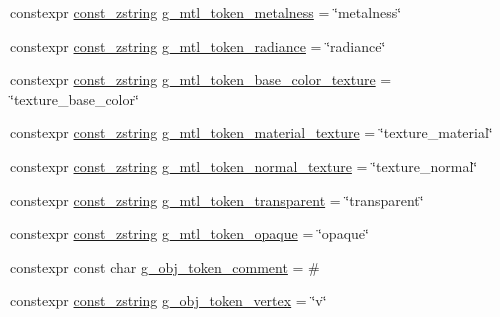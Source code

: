 \begin{DoxyCompactItemize}
\item 
constexpr \hyperlink{namespacemage_abfd9206dc607ceb5d13ec68bf075a5c0}{const\+\_\+zstring} \hyperlink{namespacemage_1_1rendering_1_1loader_a17bfd9071437318629c792d38ca71808}{g\+\_\+mtl\+\_\+token\+\_\+metalness} = \char`\"{}metalness\char`\"{}
\item 
constexpr \hyperlink{namespacemage_abfd9206dc607ceb5d13ec68bf075a5c0}{const\+\_\+zstring} \hyperlink{namespacemage_1_1rendering_1_1loader_a5abd3a154bef9be04f7649447c50164a}{g\+\_\+mtl\+\_\+token\+\_\+radiance} = \char`\"{}radiance\char`\"{}
\item 
constexpr \hyperlink{namespacemage_abfd9206dc607ceb5d13ec68bf075a5c0}{const\+\_\+zstring} \hyperlink{namespacemage_1_1rendering_1_1loader_aa3dfb00f93883473d1ff397f0079364e}{g\+\_\+mtl\+\_\+token\+\_\+base\+\_\+color\+\_\+texture} = \char`\"{}texture\+\_\+base\+\_\+color\char`\"{}
\item 
constexpr \hyperlink{namespacemage_abfd9206dc607ceb5d13ec68bf075a5c0}{const\+\_\+zstring} \hyperlink{namespacemage_1_1rendering_1_1loader_a0bd068f0f246c00b56412b1bd7f70ed4}{g\+\_\+mtl\+\_\+token\+\_\+material\+\_\+texture} = \char`\"{}texture\+\_\+material\char`\"{}
\item 
constexpr \hyperlink{namespacemage_abfd9206dc607ceb5d13ec68bf075a5c0}{const\+\_\+zstring} \hyperlink{namespacemage_1_1rendering_1_1loader_afa917f0393f16f0fec40ad5d85aa65f9}{g\+\_\+mtl\+\_\+token\+\_\+normal\+\_\+texture} = \char`\"{}texture\+\_\+normal\char`\"{}
\item 
constexpr \hyperlink{namespacemage_abfd9206dc607ceb5d13ec68bf075a5c0}{const\+\_\+zstring} \hyperlink{namespacemage_1_1rendering_1_1loader_a2e86bdf00ab5d9721684b02b575a9df7}{g\+\_\+mtl\+\_\+token\+\_\+transparent} = \char`\"{}transparent\char`\"{}
\item 
constexpr \hyperlink{namespacemage_abfd9206dc607ceb5d13ec68bf075a5c0}{const\+\_\+zstring} \hyperlink{namespacemage_1_1rendering_1_1loader_a6f5ffd9bd3336fb8589c59a322ca2b1e}{g\+\_\+mtl\+\_\+token\+\_\+opaque} = \char`\"{}opaque\char`\"{}
\item 
constexpr const char \hyperlink{namespacemage_1_1rendering_1_1loader_a28d2091ac0bc8a30979e417ca93adfb9}{g\+\_\+obj\+\_\+token\+\_\+comment} = \textquotesingle{}\#\textquotesingle{}
\item 
constexpr \hyperlink{namespacemage_abfd9206dc607ceb5d13ec68bf075a5c0}{const\+\_\+zstring} \hyperlink{namespacemage_1_1rendering_1_1loader_af514e04ff45fa5aeddcb1cfc24fb77b1}{g\+\_\+obj\+\_\+token\+\_\+vertex} = \char`\"{}v\char`\"{}

\end{DoxyCompactItemize}
